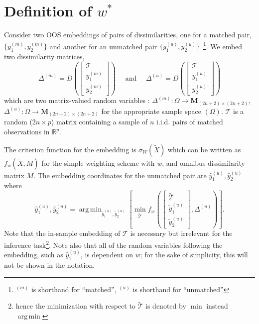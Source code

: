 \documentclass[11pt]{article} %
\DeclareMathOperator*{\argmin}{arg\,min}
\begin{document}
 

\section{Definition of  $w^{*}$}
Consider two OOS embeddings of pairs of dissimilarities, one for a matched pair, $\{y_{1}^{(m)} ,y_{2}^{(m)}\}$
 and another for an unmatched pair $\{y_{1}^{(u)} ,y_{2}^{(u)}\}$~\footnote{\! $^{(m)}$ is shorthand for ``matched'', $^{(u)}$ is shorthand for ``unmatched''}.
We embed two dissimilarity matrices, \[
 \Delta^{(m)} =D \left(\left[
\begin{array}{c}
\mathcal{T} \\
y_{1}^{(m)} \\
y_{2}^{(m)} 
\end {array}
\right]
\right)
 \hspace{1em} \textrm { and } \hspace{1em}
\Delta^{(u)} =D \left(\left[
\begin{array}{c}
\mathcal{T}\\
y_{1}^{(u)} \\
y_{2}^{(u)}
\end {array}
\right]\right) 
\]
which are two matrix-valued random variables : $\Delta^{(m)}:\Omega \rightarrow \mathbf{M}_{(2n+2)\times (2n+2)} $,$\Delta^{(u)}:\Omega \rightarrow \mathbf{M}_{(2n+2)\times (2n+2)} $  for the appropriate sample  space $(\Omega)$. $\mathcal{T}$ is a random ($2n \times p$) matrix containing a sample of  $n$ i.i.d.  pairs of  matched observations in $\mathbb{R}^p$.

 The criterion function for the embedding is $\sigma_W(\widetilde{X})$ which can be written as $f_w(\widetilde{X},M)$ for the simple weighting scheme with $w$, and omnibus dissimilarity matrix $M$. The embedding coordinates for the unmatched pair are  ${\hat{y}_{1}^{(u)},\hat{y}_{2}^{(u)}}$ where
 \[
{\hat{y}_{1}^{(u)},\hat{y}_{2}^{(u)}}
=\argmin_{\widetilde{y}_{1}^{(u)}, \widetilde{y}_{2}^{(u)}}\left[\min_{\widetilde{\mathcal{T}}}
{f_w\left(
\left[
\begin{array}{c}
{\widetilde{\mathcal{T}}} \\
\widetilde{y}_{1}^{(u)} \\
\widetilde{y}_{2}^{(u)}
\end {array}
\right]
,
\Delta^{(u)}
\right)
}
\right].
\]
 Note that the in-sample embedding of $\mathcal{T}$ is necessary but irrelevant for the inference task\footnote{\! hence the minimization with respect to $\widetilde{\mathcal{T}}$ is denoted by  $\min$ instead $\argmin$}. 
 Note also that  all of the random variables following the embedding, such as $\hat{y}_{1}^{(u)}\!$,  is dependent on $w$; for the sake of simplicity, this will not be shown in the notation. 
\end{document}
